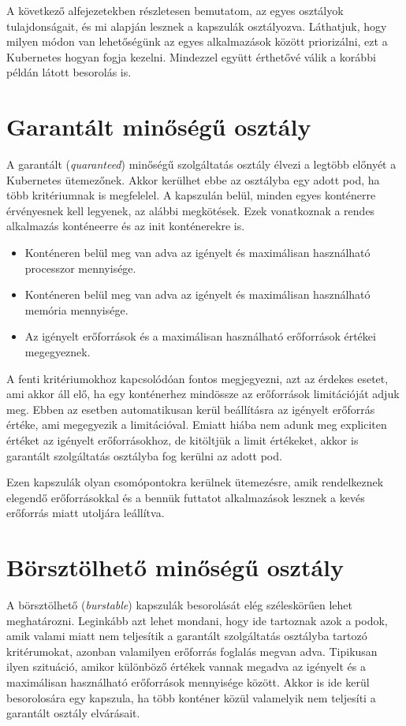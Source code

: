 A következő alfejezetekben részletesen bemutatom, az egyes osztályok tulajdonságait, és mi alapján lesznek a kapszulák osztályozva.
Láthatjuk, hogy milyen módon van lehetőségünk az egyes alkalmazások között priorizálni, ezt a Kubernetes hogyan fogja kezelni.
Mindezzel együtt érthetővé válik a korábbi példán látott besorolás is.


\section{Garantált minőségű osztály}

A garantált (\textit{quaranteed}) minőségű szolgáltatás osztály élvezi a legtöbb előnyét a Kubernetes ütemezőnek.
Akkor kerülhet ebbe az osztályba egy adott pod, ha több kritériumnak is megfelelel.
A kapszulán belül, minden egyes konténerre érvényesnek kell legyenek, az alábbi megkötések. 
Ezek vonatkoznak a rendes alkalmazás konténeerre és az init konténerekre is.

\begin{itemize}
    \item Konténeren belül meg van adva az igényelt és maximálisan használható processzor mennyisége.
    \item Konténeren belül meg van adva az igényelt és maximálisan használható memória mennyisége.
    \item Az igényelt erőforrások és a maximálisan használható erőforrások értékei megegyeznek.
\end{itemize}

A fenti kritériumokhoz kapcsolódóan fontos megjegyezni, azt az érdekes esetet, ami akkor áll elő, ha egy konténerhez mindössze az erőforrások limitációját adjuk meg.
Ebben az esetben automatikusan kerül beállításra az igényelt erőforrás értéke, ami megegyezik a limitációval.
Emiatt hiába nem adunk meg expliciten értéket az igényelt erőforrásokhoz, de kitöltjük a limit értékeket, akkor is garantált szolgáltatás osztályba fog kerülni az adott pod.

Ezen kapszulák olyan csomópontokra kerülnek ütemezésre, amik rendelkeznek elegendő erőforrásokkal és a bennük futtatot alkalmazások lesznek a kevés erőforrás miatt utoljára leállítva.

\section{Börsztölhető minőségű osztály}
A börsztölhető (\textit{burstable}) kapszulák besorolását elég széleskörűen lehet meghatározni.
Leginkább azt lehet mondani, hogy ide tartoznak azok a podok, amik valami miatt nem teljesítik a garantált szolgáltatás osztályba tartozó kritérumokat, azonban valamilyen erőforrás foglalás megvan adva.
Tipikusan ilyen szituáció, amikor különböző értékek vannak megadva az igényelt és a maximálisan használható erőforrások mennyisége között.
Akkor is ide kerül besorolosára egy kapszula, ha több konténer közül valamelyik nem teljesíti a garantált osztály elvárásait.

